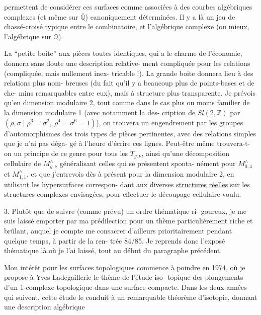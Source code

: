 
permettent de considérer ces surfaces comme associées à des courbes
algébriques complexes (et même sur $\overline{\mathbb{Q}}$) canoniquement déterminées.
Il y a là un jeu de chassé-croisé typique entre le combinatoire,
et l'algébrique complexe (ou mieux, l'algébrique sur $\overline{\mathbb{Q}}$).

La ``petite boite'' aux pièces toutes identiques, qui a le
charme de l'économie, donnera sans doute une description relative-%
ment compliquée pour les relations (compliquée, mais nullement inex-%
tricable !). La grande boite donnera lieu à des relations plus nom-%
breuses (du fait qu'il y a beaucoup plus de points-bases et de che-%
mins remarquables entre eux), mais à structure plus transparente. Je
prévois qu'en dimension modulaire 2, tout comme dans le cas plus ou
moins familier de la dimension modulaire 1 (avec notamment la des-%
cription de $Sl(2,\mathbb{Z})$ par $(\rho,\sigma \mid \rho^3 = \sigma^2,\ \rho^4 = \sigma^6 = 1)$), on trouvera
un engendrement par les groupes d'automorphismes des trois types de
pièces pertinentes, avec des relations simples que je n'ai pas déga-%
gé à l'heure d'écrire ces lignes. Peut-être même trouvera-t-on un
principe de ce genre pour tous les $T_{g,\nu}$, ainsi qu'une décomposition
cellulaire de $M^{\wedge}_{g,\nu}$ généralisant celles qui se présentent sponta-%
nément pour $M^{\wedge}_{0,4}$ et $M^{\wedge}_{1,1}$, et que j'entrevois dès à présent pour
la dimension modulaire 2, en utilisant les hypersurfaces correspon-%
dant aux diverses \uline{structures réelles} sur les structures complexes
envisagées, pour effectuer le découpage cellulaire voulu.


3. Plutôt que de suivre (comme prévu) un ordre thématique ri-%
goureux, je me suis laissé emporter par ma prédilection pour un thème
particulièrement riche et brûlant, auquel je compte me consacrer
d'ailleurs prioritairement pendant quelque temps, à partir de la ren-%
trée 84/85. Je reprends donc l'exposé thématique là où je l'ai laissé,
tout au début du paragraphe précédent.

Mon intérêt pour les surfaces topologiques commence à poindre
en 1974, où je propose à Yves Ladegaillerie le thème de l'étude iso-%
topique des plongements d'un 1-complexe topologique dans une surface
compacte. Dans les deux années qui suivent, cette étude le conduit à
un remarquable théorème d'isotopie, donnant une description algébrique

